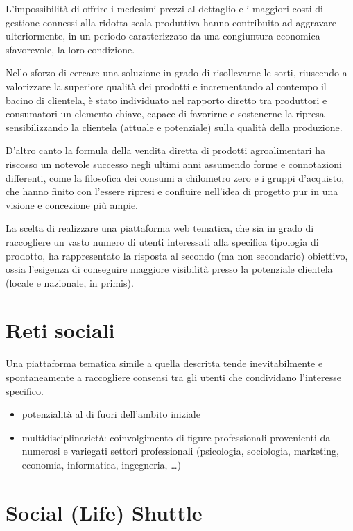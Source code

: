 \documentclass[11pt,a4paper,headsepline,hidelinks]{scrreprt} %
\begin{document}
	L'impossibilità di offrire i medesimi prezzi al dettaglio e i maggiori costi di gestione connessi alla ridotta scala produttiva hanno contribuito ad aggravare ulteriormente, in un periodo caratterizzato da una congiuntura economica sfavorevole, la loro condizione.

	Nello sforzo di cercare una soluzione in grado di risollevarne le sorti, riuscendo a valorizzare la superiore qualità dei prodotti e incrementando al contempo il bacino di clientela, è stato individuato nel rapporto diretto tra produttori e consumatori un elemento chiave, capace di favorirne e sostenerne la ripresa sensibilizzando la clientela (attuale e potenziale) sulla qualità della produzione.

	D'altro canto la formula della vendita diretta di prodotti agroalimentari ha riscosso un notevole successo negli ultimi anni assumendo forme e connotazioni differenti, come la filosofica dei consumi a \underline{chilometro zero} e i \underline{gruppi d'acquisto}, che hanno finito con l'essere ripresi e confluire nell'idea di progetto pur in una visione e concezione più ampie.

	La scelta di realizzare una piattaforma web tematica, che sia in grado di raccogliere un vasto numero di utenti interessati alla specifica tipologia di prodotto, ha rappresentato la risposta al secondo (ma non secondario) obiettivo, ossia l'esigenza di conseguire maggiore visibilità presso la potenziale clientela (locale e nazionale, in primis).

	\section{Reti sociali}
	Una piattaforma tematica simile a quella descritta tende inevitabilmente e spontaneamente a raccogliere consensi tra gli utenti che condividano l'interesse specifico.

	\begin{itemize}
	\item potenzialità al di fuori dell'ambito iniziale
	\item multidisciplinarietà: coinvolgimento di figure professionali provenienti da numerosi e variegati settori professionali (psicologia, sociologia, marketing, economia, informatica, ingegneria, \ldots)
	\end{itemize}

	\section{Social (Life) Shuttle}
\end{document}
